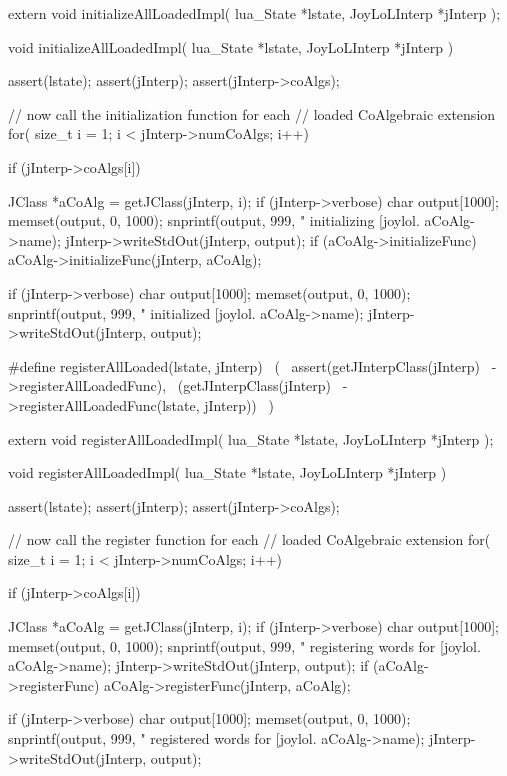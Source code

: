 \startCHeader
extern void initializeAllLoadedImpl(
  lua_State    *lstate,
  JoyLoLInterp *jInterp
);
\stopCHeader
{}

\startCCode
void initializeAllLoadedImpl(
  lua_State    *lstate,
  JoyLoLInterp *jInterp
) {
  assert(lstate);
  assert(jInterp);
  assert(jInterp->coAlgs);
  
  // now call the initialization function for each 
  // loaded CoAlgebraic extension
  for( size_t i = 1; i < jInterp->numCoAlgs; i++) {
    if (jInterp->coAlgs[i]) {
      JClass *aCoAlg = getJClass(jInterp, i);
      if (jInterp->verbose) {
        char output[1000];
        memset(output, 0, 1000);
        snprintf(output, 999, 
          "    initializing [joylol.%
          aCoAlg->name);
        jInterp->writeStdOut(jInterp, output);
      }
      if (aCoAlg->initializeFunc)
        aCoAlg->initializeFunc(jInterp, aCoAlg);

      if (jInterp->verbose) {
        char output[1000];
        memset(output, 0, 1000);
        snprintf(output, 999, 
          "    initialized [joylol.%
          aCoAlg->name);
        jInterp->writeStdOut(jInterp, output);
      }
    }
  }
}
\stopCCode
\stopTestSuite

\startTestSuite[registerAllLoaded]

\startCHeader
#define registerAllLoaded(lstate, jInterp)      \
  (                                               \
    assert(getJInterpClass(jInterp)               \
      ->registerAllLoadedFunc),                 \
    (getJInterpClass(jInterp)                     \
      ->registerAllLoadedFunc(lstate, jInterp)) \
  )
\stopCHeader

\setCHeaderStream{private}
\startCHeader
extern void registerAllLoadedImpl(
  lua_State    *lstate,
  JoyLoLInterp *jInterp
);
\stopCHeader
{}

\startCCode
void registerAllLoadedImpl(
  lua_State    *lstate,
  JoyLoLInterp *jInterp
) {
  assert(lstate);
  assert(jInterp);
  assert(jInterp->coAlgs);
  
  // now call the register function for each 
  // loaded CoAlgebraic extension
  for( size_t i = 1; i < jInterp->numCoAlgs; i++) {
    if (jInterp->coAlgs[i]) {
      JClass *aCoAlg = getJClass(jInterp, i);
      if (jInterp->verbose) {
        char output[1000];
        memset(output, 0, 1000);
        snprintf(output, 999,
          "    registering words for [joylol.%
          aCoAlg->name);
        jInterp->writeStdOut(jInterp, output);
      }
      if (aCoAlg->registerFunc)
        aCoAlg->registerFunc(jInterp, aCoAlg);
        
      if (jInterp->verbose) {
        char output[1000];
        memset(output, 0, 1000);
        snprintf(output, 999, 
          "    registered words for [joylol.%
          aCoAlg->name);
        jInterp->writeStdOut(jInterp, output);
      }
    }
  }
}
\stopCCode
\stopTestSuite

